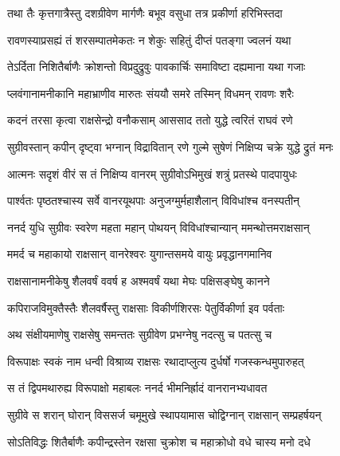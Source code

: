
\twolineshloka
{तथा तैः कृत्तगात्रैस्तु दशग्रीवेण मार्गणैः}
{बभूव वसुधा तत्र प्रकीर्णा हरिभिस्तदा} %

\twolineshloka
{रावणस्याप्रसह्यं तं शरसम्पातमेकतः}
{न शेकुः सहितुं दीप्तं पतङ्गा ज्वलनं यथा} %

\twolineshloka
{तेऽर्दिता निशितैर्बाणैः क्रोशन्तो विप्रदुद्रुवुः}
{पावकार्चिः समाविष्टा दह्यमाना यथा गजाः} %

\twolineshloka
{प्लवंगानामनीकानि महाभ्राणीव मारुतः}
{संययौ समरे तस्मिन् विधमन् रावणः शरैः} %

\twolineshloka
{कदनं तरसा कृत्वा राक्षसेन्द्रो वनौकसाम्}
{आससाद ततो युद्धे त्वरितं राघवं रणे} %

\twolineshloka
{सुग्रीवस्तान् कपीन् दृष्ट्वा भग्नान् विद्रावितान् रणे}
{गुल्मे सुषेणं निक्षिप्य चक्रे युद्धे द्रुतं मनः} %

\twolineshloka
{आत्मनः सदृशं वीरं स तं निक्षिप्य वानरम्}
{सुग्रीवोऽभिमुखं शत्रुं प्रतस्थे पादपायुधः} %

\twolineshloka
{पार्श्वतः पृष्ठतश्चास्य सर्वे वानरयूथपाः}
{अनुजग्मुर्महाशैलान् विविधांश्च वनस्पतीन्} %

\twolineshloka
{ननर्द युधि सुग्रीवः स्वरेण महता महान्}
{पोथयन् विविधांश्चान्यान् ममन्थोत्तमराक्षसान्} %

\twolineshloka
{ममर्द च महाकायो राक्षसान् वानरेश्वरः}
{युगान्तसमये वायुः प्रवृद्धानगमानिव} %

\twolineshloka
{राक्षसानामनीकेषु शैलवर्षं ववर्ष ह}
{अश्मवर्षं यथा मेघः पक्षिसङ्घेषु कानने} %

\twolineshloka
{कपिराजविमुक्तैस्तैः शैलवर्षैस्तु राक्षसाः}
{विकीर्णशिरसः पेतुर्विकीर्णा इव पर्वताः} %

\twolineshloka
{अथ संक्षीयमाणेषु राक्षसेषु समन्ततः}
{सुग्रीवेण प्रभग्नेषु नदत्सु च पतत्सु च} %

\twolineshloka
{विरूपाक्षः स्वकं नाम धन्वी विश्राव्य राक्षसः}
{रथादाप्लुत्य दुर्धर्षो गजस्कन्धमुपारुहत्} %

\twolineshloka
{स तं द्विपमथारुह्य विरूपाक्षो महाबलः}
{ननर्द भीमनिर्ह्रादं वानरानभ्यधावत} %

\twolineshloka
{सुग्रीवे स शरान् घोरान् विससर्ज चमूमुखे}
{स्थापयामास चोद्विग्नान् राक्षसान् सम्प्रहर्षयन्} %

\twolineshloka
{सोऽतिविद्धः शितैर्बाणैः कपीन्द्रस्तेन रक्षसा}
{चुक्रोश च महाक्रोधो वधे चास्य मनो दधे} %

